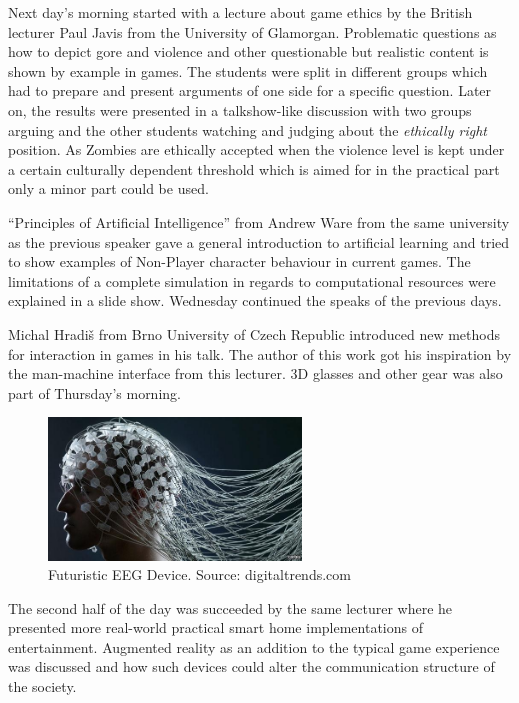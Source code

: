 \documentclass[bibtotocnumbered, headsepline,normalheadings,12pt]{report}
\begin{document}
Next day's morning started with a lecture about game ethics by the British lecturer Paul Javis from the University of Glamorgan. Problematic questions as 
how to depict gore and violence and other questionable but realistic content is shown by example in games. The students were split in different groups which 
had to prepare and present arguments of one side for a specific question. Later on, the results were presented in a talkshow-like discussion with two 
groups arguing and the other students watching and judging about the \textsl{ethically right} position. As Zombies are ethically accepted when the 
violence level is kept under a certain culturally dependent threshold which is aimed for in the practical part only a minor part could be used.

``Principles of Artificial Intelligence'' from Andrew Ware from the same university as the previous speaker gave a general introduction to artificial learning 
and tried to show examples of Non-Player character behaviour in current games. The limitations of a complete simulation in regards to computational resources
were explained in a slide show.
Wednesday continued the speaks of the previous days.

Michal Hradiš from Brno University of Czech Republic introduced new methods for interaction in games in his talk. The author of this work got his 
inspiration by the man-machine interface from this lecturer. 3D glasses and other gear was also part of Thursday's morning.

\begin{figure}[H]
    \centering
    \includegraphics[width=0.6\textwidth]{eeg.png}%
    \caption{Futuristic EEG Device. Source: digitaltrends.com}
    \label{fig:bebis}%
\end{figure}

The second half of the day was succeeded by the same lecturer where he presented more real-world practical smart home implementations of entertainment. 
Augmented reality as an addition to the typical game experience was discussed and how such devices could alter the communication structure of the society.
\end{document}
